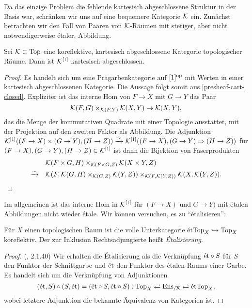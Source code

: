 Da das einzige Problem die fehlende kartesisch abgeschlossene Struktur
in der Basis war, schränken wir uns auf eine bequemere Kategorie $\mathcal{K}$
ein. Zunächst betrachten wir den Fall von Paaren von $\mathcal{K}$-Räumen mit
stetiger, aber nicht notwendigerweise étaler, Abbildung.
\begin{lemma} \label{k-arrow-cart-closed}
  Sei $\mathcal{K} \subset \operatorname{Top}$ eine koreflektive, kartesisch abgeschlossene
  Kategorie topologischer Räume. Dann ist $\mathcal{K}^{[1]}$ kartesisch
  abgeschlossen.
\end{lemma}
\begin{proof}
  Es handelt sich um eine Prägarbenkategorie auf $[1]^\mathrm{op}$ mit Werten in
  einer kartesisch abgeschlossenen Kategorie. Die Aussage folgt somit
  aus \ref{presheaf-cart-closed}. Expliziter ist das interne Hom von
  $F \to X$ mit $G \to Y$ das Paar
  \[ \mathcal{K}(F, G) \times_{\mathcal{K}(F, Y)} \mathcal{K}(X, Y) \to \mathcal{K}(X, Y),
  \]
  das die Menge der kommutativen Quadrate mit einer Topologie
  ausstattet, mit der Projektion auf den zweiten Faktor als
  Abbildung. Die Adjunktion $\mathcal{K}^{[1]}((F \to X) \times (G \to Y), (H
  \to Z)) \xrightarrow[]{\sim} \mathcal{K}^{[1]}((F \to X), (G \to Y) \Rightarrow (H \to Z))$ für
  $(F \to X), (G \to Y), (H \to Z) \in \mathcal{K}^{[1]}$ ist dann die
  Bijektion von Faserprodukten
  \begin{align*}
    &\mathcal{K}(F \times G, H) \times_{\mathcal{K}(F \times G, Z)} \mathcal{K}(X \times Y, Z) \\
    \xrightarrow[]{\sim} \quad &\mathcal{K}(F, \mathcal{K}(G, H) \times_{\mathcal{K}(G, Z)} \mathcal{K}(Y, Z))
    \times_{\mathcal{K}(F, \mathcal{K}(Y, Z))} \mathcal{K}(X, \mathcal{K}(Y, Z)).
  \end{align*}
\end{proof}
Im allgemeinen ist das interne Hom in $\mathcal{K}^{[1]}$ für $(F \to X)$ und $G
\to Y)$ mit étalen Abbildungen nicht wieder étale. Wir können
versuchen, es zu ``étalisieren'':
\begin{lemma}[\cite{TG}, 2.1.40]
  Für $X$ einen topologischen Raum ist die volle Unterkategorie
  $\mathrm{\acute{e}tTop}_X \hookrightarrow \operatorname{Top}_X$ koreflektiv. Der zur Inklusion
  Rechtsadjungierte heißt \emph{Étalisierung}.
\end{lemma}
\begin{proof} (\cite{TG}, 2.1.40)
  Wir erhalten die Étalisierung als die Verknüpfung $\mathrm{\acute{e}t} \circ S$ für
  $S$ den Funktor der Schnittgarbe und $\mathrm{\acute{e}t}$ den Funktor des étalen
  Raums einer Garbe. Es handelt sich um die Verknüpfung von
  Adjunktionen
  \[(\mathrm{\acute{e}t}, S) \circ (S, \mathrm{\acute{e}t}) = (\mathrm{\acute{e}t} \circ S, \mathrm{\acute{e}t} \circ S):
  \operatorname{Top}_X \rightleftarrows \operatorname{Ens_{/X}} \rightleftarrows \mathrm{\acute{e}tTop}_X,
  \]
  wobei letztere Adjunktion die bekannte Äquivalenz von Kategorien
  ist.
\end{proof}
